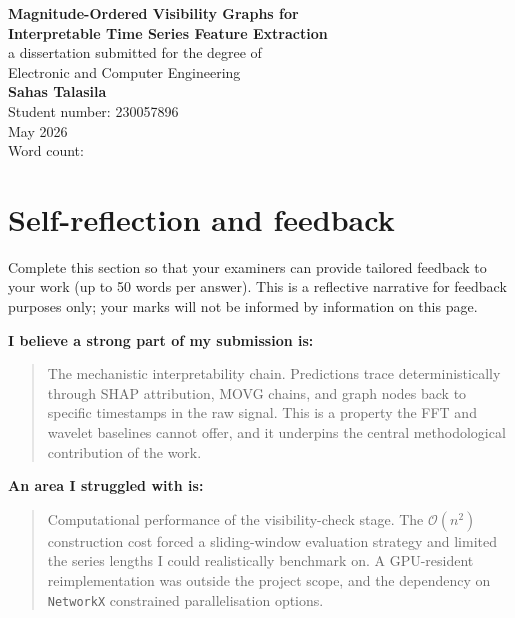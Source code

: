 \documentclass[a4paper,12pt]{article}
\begin{document}
\begin{titlepage}
    \centering
    \vspace*{2cm}
    \Huge{\textbf{Magnitude-Ordered Visibility Graphs for\\[0.3cm] Interpretable Time Series Feature Extraction}}\\[1.5cm]
    \large{a dissertation submitted for the degree of}\\[0.3cm]
    \large{Electronic and Computer Engineering}\\[2cm]
    \Large{\textbf{Sahas Talasila}}\\[0.5cm]
    \large{Student number: 230057896}\\[2cm]
    \large{May 2026}\\[1.5cm]
    \large{Word count: }
    \vfill
\end{titlepage}

\tableofcontents
\newpage

\section*{Self-reflection and feedback}

Complete this section so that your examiners can provide tailored feedback to your work (up to 50 words per answer). This is a reflective narrative for feedback purposes only; your marks will not be informed by information on this page.

\vspace{0.5cm}
\noindent\textbf{I believe a strong part of my submission is:}
\begin{quote}
The mechanistic interpretability chain. Predictions trace deterministically through SHAP attribution, MOVG chains, and graph nodes back to specific timestamps in the raw signal. This is a property the FFT and wavelet baselines cannot offer, and it underpins the central methodological contribution of the work.
\end{quote}

\vspace{0.3cm}
\noindent\textbf{An area I struggled with is:}
\begin{quote}
Computational performance of the visibility-check stage. The $\mathcal{O}(n^2)$ construction cost forced a sliding-window evaluation strategy and limited the series lengths I could realistically benchmark on. A GPU-resident reimplementation was outside the project scope, and the dependency on \texttt{NetworkX} constrained parallelisation options.
\end{quote}
\end{document}
